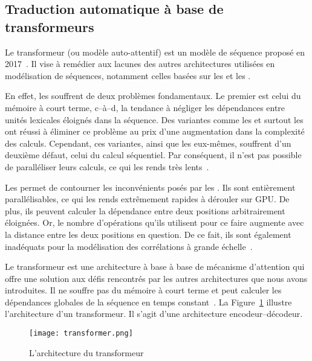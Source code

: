 \subsection{Traduction automatique à base de transformeurs}
\label{sec. nmt-attention}

Le transformeur (ou modèle auto-attentif) est un modèle de séquence proposé en 2017~\cite{attention}.
Il vise à remédier aux lacunes des autres architectures utilisées en modélisation de séquences, 
notamment celles basées sur les  et les .

En effet, les  souffrent de deux problèmes fondamentaux. 
Le premier est celui du mémoire à court terme, 
c--à--d, la tendance à négliger les dépendances entre unités lexicales éloignés dans la séquence.
Des variantes comme les  et surtout les  
ont réussi à éliminer ce problème au prix d'une augmentation dans la complexité des calculs.
Cependant, ces variantes, ainsi que les  eux-mêmes, souffrent d'un deuxième défaut,
celui du calcul séquentiel.
Par conséquent, il n'est pas possible de paralléliser leurs calculs, 
ce qui les rends très lents~\cite{attention,deep-nmt-survey}.

Les  permet de contourner les inconvénients posés par les .
Ils sont entièrement parallélisables, ce qui les rends extrêmement rapides à dérouler sur GPU.
De plus, ils peuvent calculer la dépendance entre deux positions arbitrairement éloignées.
Or, le nombre d'opérations qu'ils utilisent pour ce faire 
augmente avec la distance entre les deux positions en question.
De ce fait, ils sont également inadéquats pour la modélisation des corrélations à grande échelle~\cite{deep-nmt-survey}.

Le transformeur est une architecture à base à base de mécanisme d'attention 
qui offre une solution aux défis rencontrés par les autres architectures que nous avons introduites.
Il ne souffre pas du mémoire à court terme 
et peut calculer les dépendances globales de la séquence en temps constant~\cite{attention}.
La Figure~\ref{fig. transformer} illustre l'architecture d'un transformeur.
Il s'agit d'une architecture encodeur--décodeur.

\begin{figure}
    \begin{center}
        \texttt{[image: transformer.png]}
    \end{center}
    \caption[L'architecture du transformeur]
    {L'architecture du transformeur~\cite[Fig 1]{attention}}
    \label{fig. transformer}
\end{figure}

